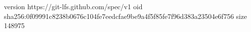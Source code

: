 version https://git-lfs.github.com/spec/v1
oid sha256:0f09991c8238b0676c104fe7eedcfae9be9a4f5f85fe7f96d383a23504e6f756
size 148975
